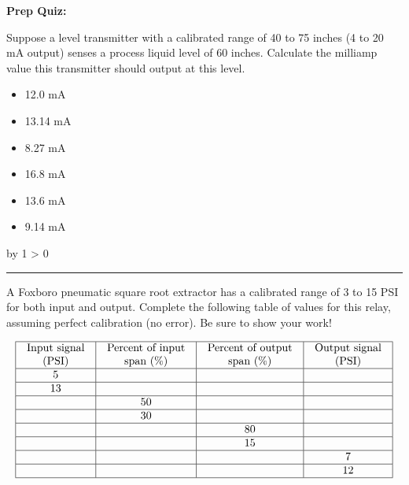 \documentclass[12pt,a4paper]{article}
\def\oppgave{
            \advance\questnum by 1
            \ifnum \questnum > 0
                 \hrule
                 \vskip 3pt
                 \leftline{Oppgave \the\questnum}
                 \vskip 3pt \fi}
\begin{document}
\vfil \eject

\noindent
{\bf Prep Quiz:}

Suppose a level transmitter with a calibrated range of 40 to 75 inches (4 to 20 mA output) senses a process liquid level of 60 inches.  Calculate the milliamp value this transmitter should output at this level.

\begin{itemize}
\item{} 12.0 mA
\vskip 5pt 
\item{} 13.14 mA
\vskip 5pt 
\item{} 8.27 mA
\vskip 5pt 
\item{} 16.8 mA
\vskip 5pt 
\item{} 13.6 mA
\vskip 5pt 
\item{} 9.14 mA
\end{itemize}


\vfil \eject 



\oppgave{} 

A Foxboro pneumatic square root extractor has a calibrated range of 3 to 15 PSI for both input and output.  Complete the following table of values for this relay, assuming perfect calibration (no error).  Be sure to show your work!


$$\vbox{\offinterlineskip
\halign{\strut
\vrule \quad\hfil # \ \hfil & 
\vrule \quad\hfil # \ \hfil & 
\vrule \quad\hfil # \ \hfil & 
\vrule \quad\hfil # \ \hfil \vrule \cr
\noalign{\hrule}
%
Input signal & Percent of input & Percent of output & Output signal \cr
%
(PSI) & span (\%) & span (\%) & (PSI) \cr
%
\noalign{\hrule}
%
5 &  &  &  \cr
%
\noalign{\hrule}
%
13 &  &  &  \cr
%
\noalign{\hrule}
%
 & 50 &  &  \cr
%
\noalign{\hrule}
%
 & 30 &  &  \cr
%
\noalign{\hrule}
%
 &  & 80 &  \cr
%
\noalign{\hrule}
%
 &  & 15 &  \cr
%
\noalign{\hrule}
%
 &  &  & 7 \cr
%
\noalign{\hrule}
%
 &  &  & 12 \cr
%
\noalign{\hrule}
} %
}$$ %
\end{document}

